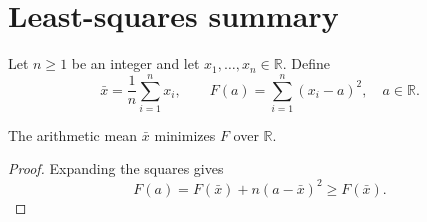 \section{Least-squares summary}
\label{sec:method}

Let $n\geq 1$ be an integer and let $x_1,\ldots,x_n\in\mathbb{R}$.
Define
\[
  \bar{x}=\frac{1}{n}\sum_{i=1}^{n}x_i,
  \qquad
  F(a)=\sum_{i=1}^{n}(x_i-a)^2,
  \quad a\in\mathbb{R}.
\]

\begin{proposition}
\label{prop:mean}
The arithmetic mean $\bar{x}$ minimizes $F$ over $\mathbb{R}$.
\end{proposition}

\begin{proof}
Expanding the squares gives
\[
  F(a)=F(\bar{x})+n(a-\bar{x})^2\geq F(\bar{x}).
\]
\end{proof}
